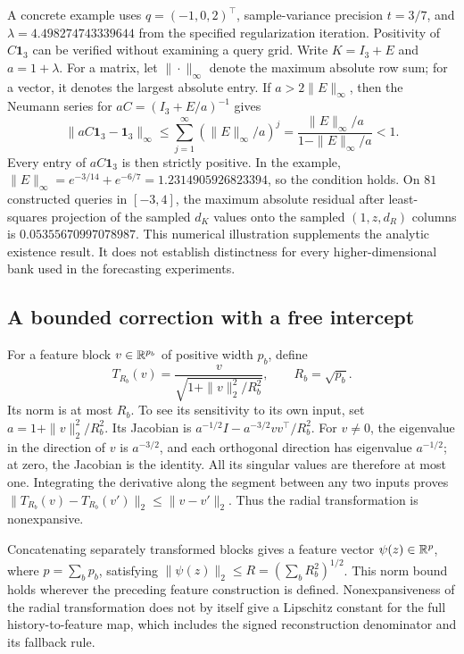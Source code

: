 A concrete example uses $q=(-1,0,2)^\top$, sample-variance precision
$t=3/7$, and $\lambda=4.498274743339644$ from the specified
regularization iteration. Positivity of $C\mathbf1_3$ can be verified
without examining a query grid. Write $K=I_3+E$ and $a=1+\lambda$.
For a matrix, let $\|\cdot\|_\infty$ denote the maximum absolute row
sum; for a vector, it denotes the largest absolute entry. If
$a>2\|E\|_\infty$, then the Neumann series for
$aC=(I_3+E/a)^{-1}$ gives
\[
 \|aC\mathbf1_3-\mathbf1_3\|_\infty
 \leq\sum_{j=1}^{\infty}(\|E\|_\infty/a)^j
 =\frac{\|E\|_\infty/a}{1-\|E\|_\infty/a}<1.
\]
Every entry of $aC\mathbf1_3$ is then strictly positive. In the example,
$\|E\|_\infty=e^{-3/14}+e^{-6/7}=1.2314905926823394$, so the
condition holds. On $81$ constructed queries in $[-3,4]$, the maximum
absolute residual after least-squares projection of the sampled $d_K$
values onto the sampled $(1,z,d_R)$ columns is
$0.05355670997078987$. This numerical illustration supplements the
analytic existence result. It does not establish distinctness for every
higher-dimensional bank used in the forecasting experiments.

\subsection{A bounded correction with a free intercept}

For a feature block $v\in\mathbb{R}^{p_b}$ of positive width $p_b$, define
\begin{equation}
 T_{R_b}(v)=\frac{v}{\sqrt{1+\|v\|_2^2/R_b^2}},\qquad
 R_b=\sqrt{p_b}.
 \label{eq:mechanism-radial}
\end{equation}
Its norm is at most $R_b$. To see its sensitivity to its own input, set
$a=1+\|v\|_2^2/R_b^2$. Its Jacobian is
$a^{-1/2}I-a^{-3/2}vv^\top/R_b^2$. For $v\ne0$, the eigenvalue in
the direction of $v$ is $a^{-3/2}$, and each orthogonal direction has
eigenvalue $a^{-1/2}$; at zero, the Jacobian is the identity. All its
singular values are therefore at most one. Integrating the derivative
along the segment between any two inputs proves
$\|T_{R_b}(v)-T_{R_b}(v')\|_2\leq\|v-v'\|_2$.
Thus the radial transformation is nonexpansive.

Concatenating separately transformed blocks gives a feature vector
$\psi(z)\in\mathbb{R}^p$, where $p=\sum_b p_b$, satisfying
$\|\psi(z)\|_2\leq R=(\sum_bR_b^2)^{1/2}$. This norm bound holds
wherever the preceding feature construction is defined. Nonexpansiveness
of the radial transformation does not by itself give a Lipschitz constant
for the full history-to-feature map, which includes the signed
reconstruction denominator and its fallback rule.

